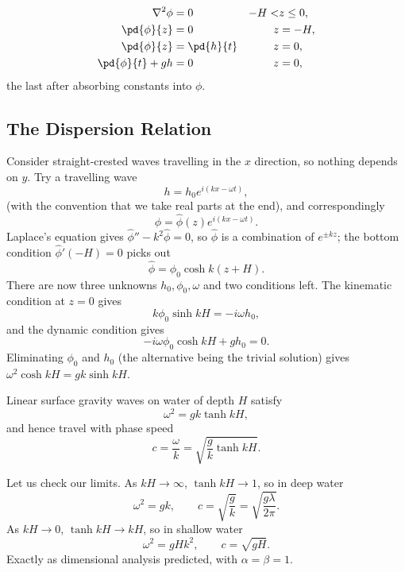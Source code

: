 \begin{proposition}
	\begin{align*}
		\nabla^2 \phi &= 0 & -H < &z \le 0, \\
		\pd{\phi}{z} &= 0 & z &= -H, \\
		\pd{\phi}{z} &= \pd{h}{t} & z &= 0, \\
		\pd{\phi}{t} + gh &= 0 & z &= 0,
	\end{align*}
	the last after absorbing constants into $\phi$.
\end{proposition}

\subsection{The Dispersion Relation}

Consider straight-crested waves travelling in the $x$ direction, so nothing depends on $y$. Try a travelling wave
$$
h = h_0 e^{i(kx - \omega t)},
$$
(with the convention that we take real parts at the end), and correspondingly
$$
\phi = \hat\phi(z) e^{i(kx - \omega t)}.
$$
Laplace's equation gives $\hat\phi'' - k^2\hat\phi = 0$, so $\hat\phi$ is a combination of $e^{\pm kz}$; the bottom condition $\hat\phi'(-H) = 0$ picks out
$$
\hat\phi = \phi_0 \cosh k(z + H).
$$
There are now three unknowns $h_0, \phi_0, \omega$ and two conditions left. The kinematic condition at $z = 0$ gives
$$
k\phi_0 \sinh kH = -i\omega h_0,
$$
and the dynamic condition gives
$$
-i\omega\phi_0 \cosh kH + g h_0 = 0.
$$
Eliminating $\phi_0$ and $h_0$ (the alternative being the trivial solution) gives $\omega^2 \cosh kH = gk\sinh kH$.

\begin{theorem}
	Linear surface gravity waves on water of depth $H$ satisfy
	$$
	\omega^2 = gk\tanh kH,
	$$
	and hence travel with phase speed
	$$
	c = \frac{\omega}{k} = \sqrt{\frac{g}{k}\tanh kH}.
	$$
\end{theorem}

Let us check our limits. As $kH \to \infty$, $\tanh kH \to 1$, so in deep water
$$
\omega^2 = gk, \qquad c = \sqrt{\frac{g}{k}} = \sqrt{\frac{g\lambda}{2\pi}}.
$$
As $kH \to 0$, $\tanh kH \to kH$, so in shallow water
$$
\omega^2 = gHk^2, \qquad c = \sqrt{gH}.
$$
Exactly as dimensional analysis predicted, with $\alpha = \beta = 1$.

